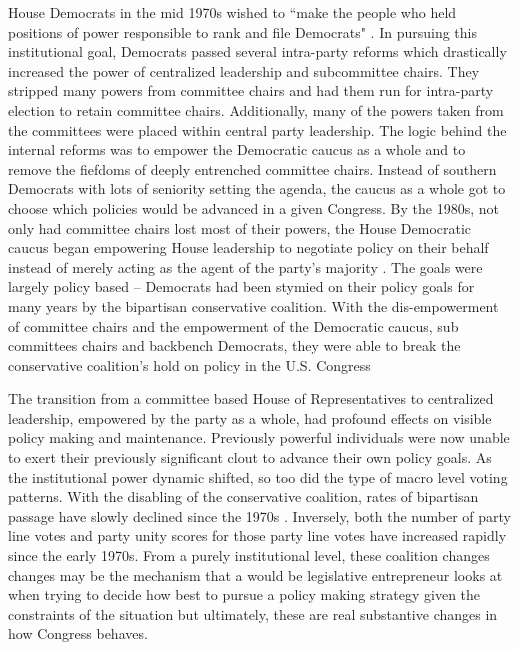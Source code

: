 \documentclass[12pt]{article}
\begin{document}
House Democrats in the mid 1970s wished to ``make the people who held positions of power responsible to rank and file Democrats" \citep[pg. 26, quote spoken by Rep. Donald Fraser (D-MN)]{rohde1991}. In pursuing this institutional goal, Democrats passed several intra-party reforms which drastically increased the power of centralized leadership and subcommittee chairs. They stripped many powers from committee chairs and had them run for intra-party election to retain committee chairs. Additionally, many of the powers taken from the committees were placed within central party leadership. The logic behind the internal reforms was to empower the Democratic caucus as a whole and to remove the fiefdoms of deeply entrenched committee chairs. Instead of southern Democrats with lots of seniority setting the agenda, the caucus as a whole got to choose which policies would be advanced in a given Congress. By the 1980s, not only had committee chairs lost most of their powers, the House Democratic caucus began empowering House leadership to negotiate policy on their behalf instead of merely acting as the agent of the party's majority \citep{sinclair1983, palazzolo1992, sinclair1998}. The goals were largely policy based -- Democrats had been stymied on their policy goals for many years by the bipartisan conservative coalition. With the dis-empowerment of committee chairs and the empowerment of the Democratic caucus, sub committees chairs and backbench Democrats, they were able to break the conservative coalition's hold on policy in the U.S. Congress

The transition from a committee based House of Representatives to centralized leadership, empowered by the party as a whole, had profound effects on visible policy making and maintenance. Previously powerful individuals were now unable to exert their previously significant clout to advance their own policy goals. As the institutional power dynamic shifted, so too did the type of macro level voting patterns. With the disabling of the conservative coalition, rates of bipartisan passage have slowly declined since the 1970s \cite{trubowitz2005}. Inversely, both the number of party line votes and party unity scores for those party line votes have increased rapidly since the early 1970s. From a purely institutional level, these coalition changes changes may be the mechanism that a would be legislative entrepreneur looks at when trying to decide how best to pursue a policy making strategy given the constraints of the situation but ultimately, these are real substantive changes in how Congress behaves. 
\end{document}
